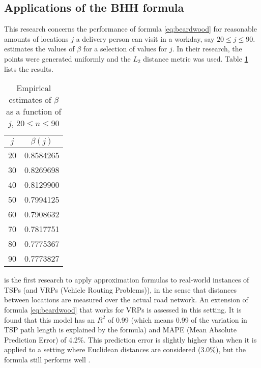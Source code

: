 \subsection{Applications of the BHH formula}
This research concerns the performance of formula \ref{eq:beardwood} for reasonable amounts of
locations $j$ a delivery person can visit in a workday, say $20\leq j\leq90$.
\citet{lei2015dynamic} estimates the values of $\beta$ for a selection of values for $j$.
In their research, the points were generated uniformly and the $L_2$ distance metric was used.
Table \ref{tab:beta-values} lists the results.
\begin{table}[H]
	\centering
	\caption{Empirical estimates of $\beta$ as a function of $j$, $20 \leq n \leq 90$ \citep{lei2015dynamic}}
	\label{tab:beta-values}
	\begin{tabular}{cc}
		\toprule
		$j$ & $\beta(j)$ \\
		\midrule
		20  & 0.8584265  \\
		30  & 0.8269698  \\
		40  & 0.8129900  \\
		50  & 0.7994125  \\
		60  & 0.7908632  \\
		70  & 0.7817751  \\
		80  & 0.7775367  \\
		90  & 0.7773827  \\
		\bottomrule
	\end{tabular}
\end{table}
\citet{figliozzi2008planning} is the first research to apply approximation formulas to real-world
instances of TSPs (and VRPs (Vehicle Routing Problems)), in the sense that distances between locations are measured over the actual road network.
An extension of formula \ref{eq:beardwood} that works for VRPs is assessed in this setting. It is found that this
model has an $R^2$ of 0.99 (which means 0.99 of the variation in TSP path length is explained by the formula)
and MAPE (Mean Absolute Prediction Error) of 4.2\%. This prediction error
is slightly higher than when it is applied to a setting where Euclidean distances are considered (3.0\%),
but the formula still performs well \citep{figliozzi2008planning}.

